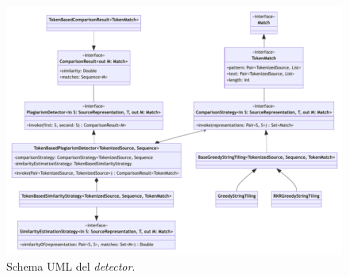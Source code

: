 \begin{figure}[h!]
    \centering
    \includegraphics[width=\textwidth]{resources/img/02-detector.pdf}
    \caption{Schema UML del \textit{detector}.}
    \label{img:02-detector}
\end{figure}


